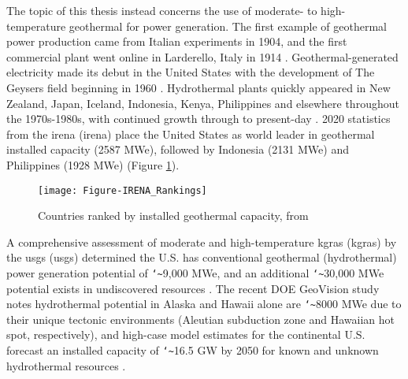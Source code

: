 The topic of this thesis instead concerns the use of moderate- to high-temperature geothermal for power generation. The first example of geothermal power production came from Italian experiments in 1904, and the first commercial plant went online in Larderello, Italy in 1914 \citep[~p. 251]{dipippo_geothermal_2012}. Geothermal-generated electricity made its debut in the United States with the development of The Geysers field beginning in 1960 \citep{tester_future_2006}. Hydrothermal plants quickly appeared in New Zealand, Japan, Iceland, Indonesia, Kenya, Philippines and elsewhere throughout the 1970s-1980s, with continued growth through to present-day \citep{lund_characteristics_2007}. 2020 statistics from the \acrlong{irena} (\acrshort{irena}) place the United States as world leader in geothermal installed capacity (2587 MWe), followed by Indonesia (2131 MWe) and Philippines (1928 MWe) \citep{irena_country_2021} (Figure \ref{fig:irena-rank}). 

\begin{figure}[htbp]
\centering
\texttt{[image: Figure-IRENA\_Rankings]}
\caption[Country rankings, installed geothermal capacity ]{Countries ranked by installed geothermal capacity, from \protect\citep{irena_country_2021}}
\label{fig:irena-rank}
\end{figure}

A comprehensive assessment of moderate and high-temperature \acrlong{kgra}s (\acrshort{kgra}s) by the \acrlong{usgs} (\acrshort{usgs}) determined the U.S. has conventional geothermal (hydrothermal) power generation potential of \texttt{\char`\~}9,000 MWe, and an additional \texttt{\char`\~}30,000 MWe potential exists in undiscovered resources \citep{williams_assessment_2008}. The recent DOE GeoVision study notes hydrothermal potential in Alaska and Hawaii alone are \texttt{\char`\~}8000 MWe due to their unique tectonic environments (Aleutian subduction zone and Hawaiian hot spot, respectively), and high-case model estimates for the continental U.S. forecast an installed capacity of \texttt{\char`\~}16.5 GW by 2050 for known and unknown hydrothermal resources \citep{augustine_geovision_2019,hamm_overview_2019}.

